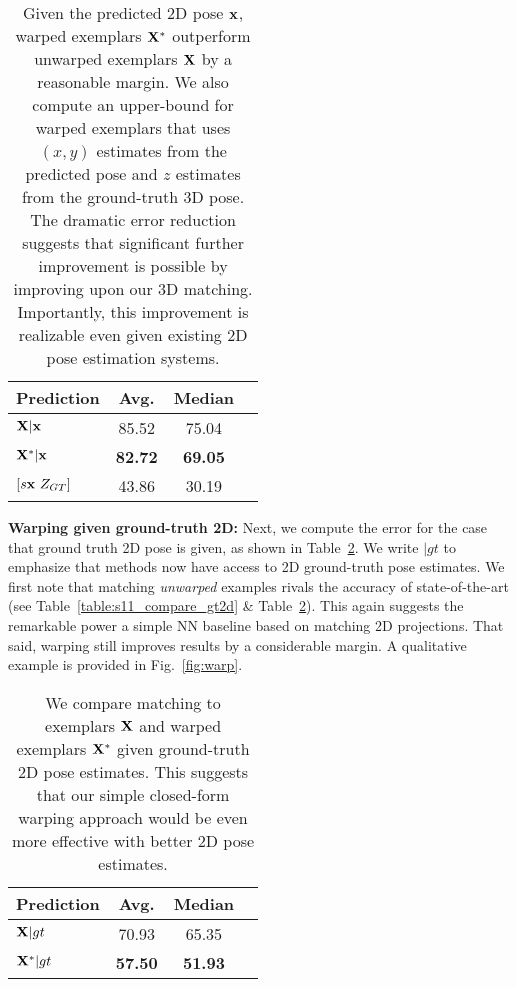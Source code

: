 \documentclass[10pt,twocolumn,letterpaper]{article}
\begin{document}
\begin{table}[t!]
\centering
\begin{tabular}{|l|c|c|c|}
\hline
Prediction & Avg. & Median \\
\hline
\hline
${\bf X}|{\bf x}$ & 85.52 & 75.04\\
${\bf X}^*|{\bf x}$ & \textbf{82.72} & \textbf{69.05}\\
\hline
$[s{\bf x}\ Z_{GT}]$ & 43.86 & 30.19\\
\hline
\end{tabular}
\caption{Given the predicted 2D pose ${\bf x}$, warped exemplars ${\bf X}^*$ outperform unwarped exemplars ${\bf X}$ by a reasonable margin. We also compute an upper-bound for warped exemplars that uses $(x,y)$ estimates from the predicted pose and $z$ estimates from the ground-truth 3D pose. The dramatic error reduction suggests that significant further improvement is possible by improving upon our 3D matching. Importantly, this improvement is realizable even given existing 2D pose estimation systems.}
\label{table: cpm_nn_comp}
\end{table}

{\bf Warping given ground-truth 2D:} Next, we compute the error for the case that ground truth 2D pose is given, as shown in Table~\ref{table: gt2d_nn_comp}. We write $|gt$ to emphasize that methods now have access to 2D ground-truth pose estimates. We first note that matching {\em unwarped} examples rivals the accuracy of state-of-the-art (see Table~\ref{table:s11_compare_gt2d} \& Table~\ref{table: gt2d_nn_comp}). This again suggests the remarkable power a simple NN baseline based on matching 2D projections. That said, warping still improves results by a considerable margin. A qualitative example is provided in Fig.~\ref{fig:warp}.

\begin{table}[t!]
\centering
\begin{tabular}{|l|c|c|c|}
\hline
Prediction & Avg. & Median \\
\hline
\hline
${\bf X}|gt$ & 70.93 & 65.35\\
${\bf X}^*|gt$ & \textbf{57.50} & \textbf{51.93}\\
\hline
\end{tabular}
\caption{We compare matching to exemplars ${\bf X}$ and warped exemplars ${\bf X}^*$ given ground-truth 2D pose estimates. This suggests that our simple closed-form warping approach would be even more effective with better 2D pose estimates.}
\label{table: gt2d_nn_comp}
\end{table}
\end{document}
